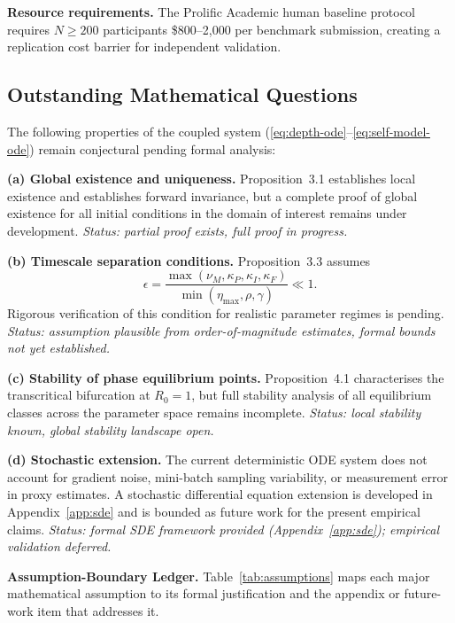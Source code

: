 \documentclass[10pt]{article}
\begin{document}
\textbf{Resource requirements.} The Prolific Academic human baseline
protocol requires $N \geq 200$ participants %
\$800--2,000 per benchmark submission, creating a replication cost
barrier for independent validation.

\subsection{Outstanding Mathematical Questions}\label{sec:open-questions}

The following properties of the coupled system (\eqref{eq:depth-ode}--\eqref{eq:self-model-ode})
remain conjectural pending formal analysis:

\textbf{(a) Global existence and uniqueness.} Proposition~3.1
establishes local existence and establishes forward invariance,
but a complete proof of global existence for all initial conditions in the
domain of interest remains under development. \emph{Status: partial
proof exists, full proof in progress.}

\textbf{(b) Timescale separation conditions.} Proposition~3.3 assumes
\begin{equation*}
\epsilon = \frac{\max(\nu_M, \kappa_P, \kappa_I, \kappa_F)}{\min(\eta_{\max}, \rho, \gamma)} \ll 1.
\end{equation*}
Rigorous verification of this condition for realistic parameter regimes
is pending. \emph{Status: assumption plausible from order-of-magnitude
estimates, formal bounds not yet established.}

\textbf{(c) Stability of phase equilibrium points.} Proposition~4.1
characterises the transcritical bifurcation at $R_0 = 1$, but full
stability analysis of all equilibrium classes across the parameter space
remains incomplete. \emph{Status: local stability known, global
stability landscape open.}

\textbf{(d) Stochastic extension.} The current deterministic ODE system
does not account for gradient noise, mini-batch sampling variability,
or measurement error in proxy estimates. A stochastic differential
equation extension is developed in Appendix~\ref{app:sde} and is bounded
as future work for the present empirical claims.
\emph{Status: formal SDE framework provided (Appendix~\ref{app:sde}); empirical
validation deferred.}

\medskip
\noindent\textbf{Assumption-Boundary Ledger.}
Table~\ref{tab:assumptions} maps each major mathematical assumption
to its formal justification and the appendix or future-work item that
addresses it.
\end{document}
